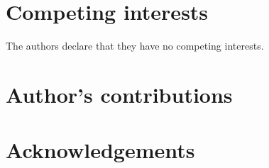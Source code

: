 \section*{Competing interests}
  The authors declare that they have no competing interests.

\section*{Author's contributions}

\section*{Acknowledgements}
